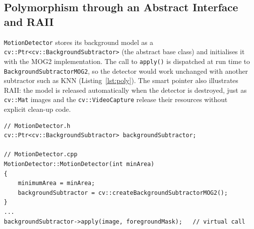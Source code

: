 \documentclass[12pt,a4paper,oneside]{book}
\begin{document}
\subsection{Polymorphism through an Abstract Interface and RAII}
\label{sec:polymorphism}
\texttt{MotionDetector} stores its background model as a \texttt{cv::\allowbreak Ptr<\allowbreak cv::\allowbreak BackgroundSubtractor>} (the abstract base class) and initialises it with the MOG2 implementation. The call to \texttt{apply()} is dispatched at run time to \texttt{BackgroundSubtractorMOG2}, so the detector would work unchanged with another subtractor such as KNN (Listing~\ref{lst:poly}). The smart pointer also illustrates RAII: the model is released automatically when the detector is destroyed, just as \texttt{cv::Mat} images and the \texttt{cv::VideoCapture} release their resources without explicit clean-up code.

\begin{minipage}{\linewidth}
\begin{lstlisting}[caption={Programming to the abstract \texttt{cv::BackgroundSubtractor} interface.}, label={lst:poly}]
// MotionDetector.h
cv::Ptr<cv::BackgroundSubtractor> backgroundSubtractor;

// MotionDetector.cpp
MotionDetector::MotionDetector(int minArea)
{
    minimumArea = minArea;
    backgroundSubtractor = cv::createBackgroundSubtractorMOG2();
}
...
backgroundSubtractor->apply(image, foregroundMask);   // virtual call
\end{lstlisting}
\end{minipage}
\end{document}
